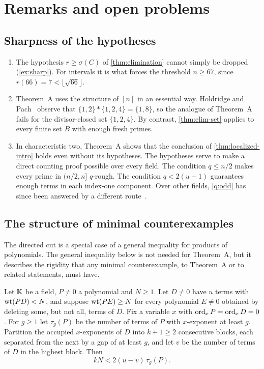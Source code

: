 \section{Remarks and open problems}\label{sec:remarks}

\subsection{Sharpness of the hypotheses}
\begin{enumerate}[label=\textup{(\alph*)}]
\item The hypothesis $r\ge\sigma(C)$ of \cref{thm:elimination} cannot simply be dropped (\cref{ex:sharp}). For intervals it is what forces the threshold $n\ge67$, since $r(66)=7<\lfloor\sqrt{66}\rfloor$.
\item Theorem~A uses the structure of $[n]$ in an essential way. Holdridge and Pach~\cite{HP} observe that $\{1,2\}*\{1,2,4\}=\{1,8\}$, so the analogue of Theorem~A fails for the divisor-closed set $\{1,2,4\}$. By contrast, \cref{thm:elim-set} applies to every finite set $B$ with enough fresh primes.
\item In characteristic two, Theorem~A shows that the conclusion of \cref{thm:localized-intro} holds even without its hypotheses. The hypotheses serve to make a direct counting proof possible over every field. The condition $q\le n/2$ makes every prime in $(n/2,n]$ $q$-rough. The condition $q<2(u-1)$ guarantees enough terms in each index-one component. Over other fields, \cref{q:odd} has since been answered by a different route~\cite{Weighted}.
\end{enumerate}

\subsection{The structure of minimal counterexamples}
The directed cut is a special case of a general inequality for products of polynomials. The general inequality below is not needed for Theorem~A, but it describes the rigidity that any minimal counterexample, to Theorem~A or to related statements, must have.

\begin{lemma}\label{lem:separated}
Let $\mathbb{K}$ be a field, $P\ne0$ a polynomial and $N\ge1$. Let $D\ne0$ have $u$ terms with $\operatorname{wt}(PD)<N$, and suppose $\operatorname{wt}(PE)\ge N$ for every polynomial $E\ne0$ obtained by deleting some, but not all, terms of $D$. Fix a variable $x$ with $\operatorname{ord}_xP=\operatorname{ord}_xD=0$. For $g\ge1$ let $\tau_g(P)$ be the number of terms of $P$ with $x$-exponent at least $g$. Partition the occupied $x$-exponents of $D$ into $k+1\ge2$ consecutive blocks, each separated from the next by a gap of at least $g$, and let $v$ be the number of terms of $D$ in the highest block. Then
\[
 kN<2(u-v)\,\tau_g(P).
\]
\end{lemma}

